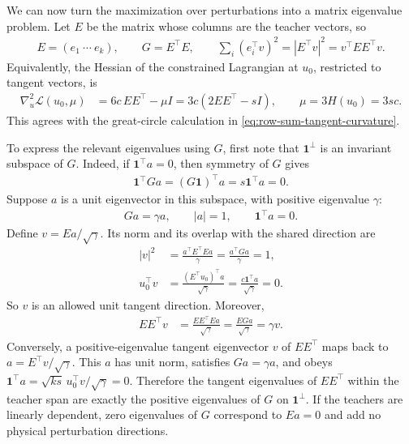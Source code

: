 \documentclass[11pt, reqno]{amsart}
\theoremstyle{notestyle}
\theoremstyle{defstyle}
\begin{document}
We can now turn the maximization over perturbations into a matrix eigenvalue problem.
Let $E$ be the matrix whose columns are the teacher vectors, so
\begin{align*}
    E=(e_1\ \cdots\ e_k),
    \qquad G=E^\top E,
    \qquad \sum_i(e_i^\top v)^2=|E^\top v|^2=v^\top EE^\top v.
\end{align*}
Equivalently, the Hessian of the constrained Lagrangian at $u_0$, restricted to tangent vectors, is
\begin{align*}
    \nabla_u^2\mathcal L(u_0,\mu)
    &=6c\,EE^\top-\mu I
    =3c(2EE^\top-sI),
    \qquad \mu=3H(u_0)=3sc.
\end{align*}
This agrees with the great-circle calculation in \eqref{eq:row-sum-tangent-curvature}.

To express the relevant eigenvalues using $G$, first note that $\mathbf 1^\perp$ is an invariant subspace of $G$.
Indeed, if $\mathbf 1^\top a=0$, then symmetry of $G$ gives
\begin{align*}
    \mathbf 1^\top Ga=(G\mathbf 1)^\top a=s\mathbf 1^\top a=0.
\end{align*}
Suppose $a$ is a unit eigenvector in this subspace, with positive eigenvalue $\gamma$:
\begin{align*}
    Ga=\gamma a,
    \qquad |a|=1,
    \qquad \mathbf 1^\top a=0.
\end{align*}
Define $v=Ea/\sqrt\gamma$.
Its norm and its overlap with the shared direction are
\begin{align*}
    |v|^2
    &=\frac{a^\top E^\top Ea}{\gamma}
    =\frac{a^\top Ga}{\gamma}=1, \\
    u_0^\top v
    &=\frac{(E^\top u_0)^\top a}{\sqrt\gamma}
    =\frac{c\mathbf 1^\top a}{\sqrt\gamma}=0.
\end{align*}
So $v$ is an allowed unit tangent direction.
Moreover,
\begin{align*}
    EE^\top v
    &=\frac{EE^\top Ea}{\sqrt\gamma}
    =\frac{EGa}{\sqrt\gamma}
    =\gamma v.
\end{align*}
Conversely, a positive-eigenvalue tangent eigenvector $v$ of $EE^\top$ maps back to $a=E^\top v/\sqrt\gamma$.
This $a$ has unit norm, satisfies $Ga=\gamma a$, and obeys $\mathbf 1^\top a=\sqrt{ks}\,u_0^\top v/\sqrt\gamma=0$.
Therefore the tangent eigenvalues of $EE^\top$ within the teacher span are exactly the positive eigenvalues of $G$ on $\mathbf 1^\perp$.
If the teachers are linearly dependent, zero eigenvalues of $G$ correspond to $Ea=0$ and add no physical perturbation directions.
\end{document}
